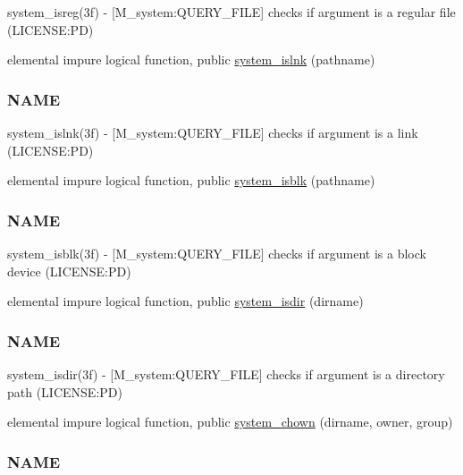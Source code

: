 \begin{DoxyCompactItemize}
\begin{DoxyCompactList}
system\+\_\+isreg(3f) -\/ \mbox{[}M\+\_\+system\+:Q\+U\+E\+R\+Y\+\_\+\+F\+I\+LE\mbox{]} checks if argument is a regular file (L\+I\+C\+E\+N\+SE\+:PD) \end{DoxyCompactList}\item 
elemental impure logical function, public \mbox{\hyperlink{namespacem__system_a268d0cd27be36527894fe2cae0f1b9f6}{system\+\_\+islnk}} (pathname)
\begin{DoxyCompactList}\small\item\em \subsubsection*{N\+A\+ME}

system\+\_\+islnk(3f) -\/ \mbox{[}M\+\_\+system\+:Q\+U\+E\+R\+Y\+\_\+\+F\+I\+LE\mbox{]} checks if argument is a link (L\+I\+C\+E\+N\+SE\+:PD) \end{DoxyCompactList}\item 
elemental impure logical function, public \mbox{\hyperlink{namespacem__system_a1294b8d8b4910261c0a0991bf668ab67}{system\+\_\+isblk}} (pathname)
\begin{DoxyCompactList}\small\item\em \subsubsection*{N\+A\+ME}

system\+\_\+isblk(3f) -\/ \mbox{[}M\+\_\+system\+:Q\+U\+E\+R\+Y\+\_\+\+F\+I\+LE\mbox{]} checks if argument is a block device (L\+I\+C\+E\+N\+SE\+:PD) \end{DoxyCompactList}\item 
elemental impure logical function, public \mbox{\hyperlink{namespacem__system_a7946ea976f399baff21caebcbe931f6d}{system\+\_\+isdir}} (dirname)
\begin{DoxyCompactList}\small\item\em \subsubsection*{N\+A\+ME}

system\+\_\+isdir(3f) -\/ \mbox{[}M\+\_\+system\+:Q\+U\+E\+R\+Y\+\_\+\+F\+I\+LE\mbox{]} checks if argument is a directory path (L\+I\+C\+E\+N\+SE\+:PD) \end{DoxyCompactList}\item 
elemental impure logical function, public \mbox{\hyperlink{namespacem__system_ab89e4d2fb219225c374570d4f9d58e9b}{system\+\_\+chown}} (dirname, owner, group)
\begin{DoxyCompactList}\small\item\em \subsubsection*{N\+A\+ME}


\end{DoxyCompactList}
\end{DoxyCompactItemize}
